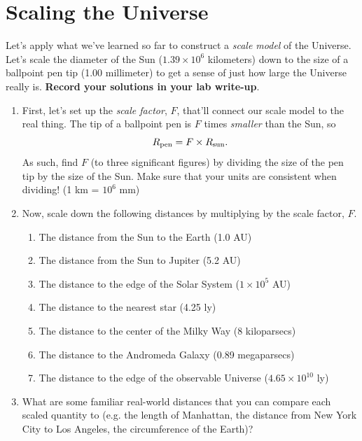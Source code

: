 \documentclass[11pt]{article}
\begin{document}
\section{Scaling the Universe}

Let's apply what we've learned so far to construct a \emph{scale model} of the Universe. Let's scale the diameter of the Sun ($1.39 \times 10^6$ kilometers) down to the size of a ballpoint pen tip (1.00 millimeter) to get a sense of just how large the Universe really is. \textbf{Record your solutions in your lab write-up}.

\begin{enumerate}
    \item First, let's set up the \emph{scale factor}, $F$, that'll connect our scale model to the real thing. The tip of a ballpoint pen is $F$ times \emph{smaller} than the Sun, so $$R_{\rm pen} = F \times R_{\rm sun}.$$ As such, find $F$ (to three significant figures) by dividing the size of the pen tip by the size of the Sun. Make sure that your units are consistent when dividing! (1 km = $10^6$ mm)
    
    \item Now, scale down the following distances by multiplying by the scale factor, $F$.
    \begin{enumerate}
        \item The distance from the Sun to the Earth (1.0 AU) 
        \item The distance from the Sun to Jupiter (5.2 AU)
        \item The distance to the edge of the Solar System ($1 \times 10^5$ AU)
        \item The distance to the nearest star (4.25 ly)
        \item The distance to the center of the Milky Way (8 kiloparsecs)
        \item The distance to the Andromeda Galaxy (0.89 megaparsecs)
        \item The distance to the edge of the observable Universe ($4.65 \times 10^{10}$ ly)
    \end{enumerate}
    
    \item What are some familiar real-world distances that you can compare each scaled quantity to (e.g. the length of Manhattan, the distance from New York City to Los Angeles, the circumference of the Earth)?
\end{enumerate}
\end{document}
